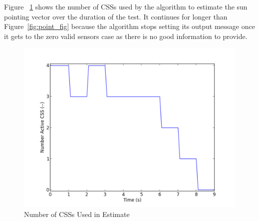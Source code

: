 \documentclass[]{BasiliskReportMemo}
\begin{document}
Figure ~\ref{fig:num_fig} shows the number of CSSs used by the algorithm to 
estimate the sun pointing vector over the duration of the test.  It continues 
for longer than Figure~\ref{fig:point_fig} because the algorithm stops setting 
its output message once it gets to the zero valid sensors case as there is no 
good information to provide.
\begin{figure}[htb]
        \centerline{
        \includegraphics[scale=0.5]{Figures/numGoodCSS}
        }
        \caption{Number of CSSs Used in Estimate}
        \label{fig:num_fig}
\end{figure}
\end{document}
